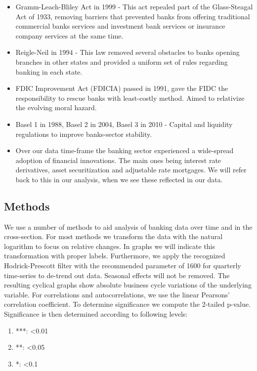 \documentclass[12pt, a4paper]{article} %
\begin{document}
\begin{itemize}
\item Gramm-Leach-Bliley Act in 1999 - This act repealed part of the Glass-Steagal Act of 1933, removing barriers that prevented banks from offering traditional commercial banks services and investment bank services or insurance company services at the same time.  
\item Reigle-Neil in 1994 - This law removed several obstacles to banks opening branches in other states and provided a uniform set of rules regarding banking in each state.
\item FDIC Improvement Act (FDICIA) passed in 1991, gave the FIDC the responsibility to rescue banks with least-costly method. Aimed to relativize the evolving moral hazard. 
\item Basel 1 in 1988, Basel 2 in 2004, Basel 3 in 2010 - Capital and liquidity regulations to improve banks-sector stability.
\item Over our data time-frame the banking sector experienced a wide-spread adoption of financial innovations. The main ones being interest rate derivatives, asset securitization and adjustable rate mortgages. We will refer back to this in our analysis, when we see these reflected in our data. 
\end{itemize}



\subsection{Methods}

We use a number of methods to aid analysis of banking data over time and in the cross-section.
For most methods we transform the data with the natural logarithm to focus on relative changes. In graphs we will indicate this transformation with proper labels. Furthermore, we apply the recognized Hodrick-Prescott filter with the recommended parameter of 1600 for quarterly time-series to de-trend out data. Seasonal effects will not be removed. The resulting cyclical graphs show absolute business cycle variations of the underlying variable. For correlations and autocorrelations, we use the linear Pearsons' correlation coefficient. To determine significance we compute the 2-tailed p-value. Significance is then determined according to following levels:
\begin{enumerate}
\item ***: <0.01
\item **: <0.05
\item *: <0.1
\end{enumerate}
\end{document}
